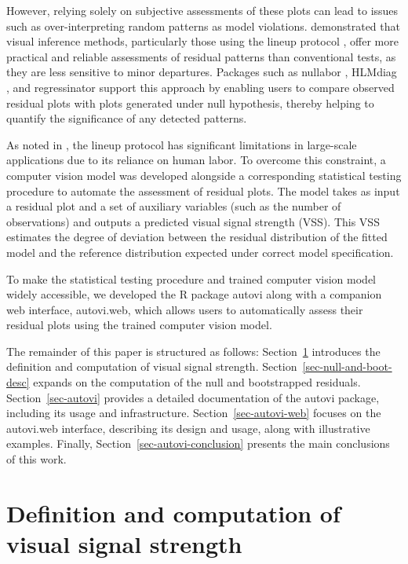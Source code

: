 \documentclass[
doublespace,
  times]{anzsauth}
\begin{document}
However, relying solely on subjective assessments of these plots can
lead to issues such as over-interpreting random patterns as model
violations. \citet{li2024plot} demonstrated that visual inference
methods, particularly those using the lineup protocol
\citep{buja2009statistical}, offer more practical and reliable
assessments of residual patterns than conventional tests, as they are
less sensitive to minor departures. Packages such as \textsf{nullabor}
\citep{nullabor}, \textsf{HLMdiag} \citep{loy2014hlmdiag}, and
\textsf{regressinator} \citep{regressinator} support this approach by
enabling users to compare observed residual plots with plots generated
under null hypothesis, thereby helping to quantify the significance of
any detected patterns.

As noted in \citet{li2024automated}, the lineup protocol has significant
limitations in large-scale applications due to its reliance on human
labor. To overcome this constraint, a computer vision model was
developed alongside a corresponding statistical testing procedure to
automate the assessment of residual plots. The model takes as input a
residual plot and a set of auxiliary variables (such as the number of
observations) and outputs a predicted visual signal strength (VSS). This
VSS estimates the degree of deviation between the residual distribution
of the fitted model and the reference distribution expected under
correct model specification.

To make the statistical testing procedure and trained computer vision
model widely accessible, we developed the \textsf{R} package
\textsf{autovi} along with a companion web interface,
\textsf{autovi.web}, which allows users to automatically assess their
residual plots using the trained computer vision model.

The remainder of this paper is structured as follows:
Section~\ref{sec-vss-desc} introduces the definition and computation of
visual signal strength. Section~\ref{sec-null-and-boot-desc} expands on
the computation of the null and bootstrapped residuals.
Section~\ref{sec-autovi} provides a detailed documentation of the
\textsf{autovi} package, including its usage and infrastructure.
Section~\ref{sec-autovi-web} focuses on the \textsf{autovi.web}
interface, describing its design and usage, along with illustrative
examples. Finally, Section~\ref{sec-autovi-conclusion} presents the main
conclusions of this work.

\section{Definition and computation of visual signal
strength}\label{sec-vss-desc}
\end{document}
